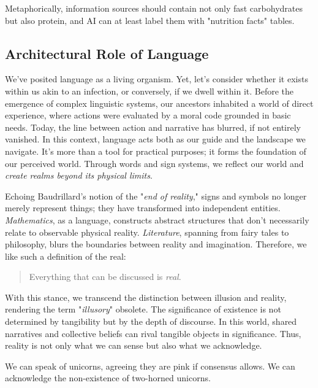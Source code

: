 \documentclass[11pt,a4]{article}
\begin{document}
    Metaphorically, information sources should contain not only fast carbohydrates but also protein, and AI can at least label them with "nutrition facts" tables.





    \subsection{Architectural Role of Language}
    We've posited language as a living organism. Yet, let's consider whether it exists within us akin to an infection, or conversely, if we dwell within it.
    Before the emergence of complex linguistic systems, our ancestors inhabited a world of direct experience, where actions were evaluated by a moral code grounded in basic needs. Today, the line between action and narrative has blurred, if not entirely vanished. In this context, language acts both as our guide and the landscape we navigate. It's more than a tool for practical purposes; it forms the foundation of our perceived world. Through words and sign systems, we reflect our world and \textit{create realms beyond its physical limits}.

    Echoing Baudrillard's notion of the "\textit{end of reality}," signs and symbols no longer merely represent things; they have transformed into independent entities.
    \textit{Mathematics}, as a language, constructs abstract structures that don't necessarily relate to observable physical reality. \textit{Literature}, spanning from fairy
    tales to philosophy, blurs the boundaries between reality and imagination. Therefore, we like such a definition of the real:

        \begin{quote}
            Everything that can be discussed is \textit{real}.
        \end{quote}

    With this stance, we transcend the distinction between illusion and reality, rendering the term "\textit{illusory}" obsolete. The significance of existence is not determined by tangibility but by the depth of discourse. In this world, shared narratives and collective beliefs can rival tangible objects in significance. Thus, reality is not only what we can sense but also what we acknowledge.

    We can speak of unicorns, agreeing they are pink if consensus allows. We can acknowledge the non-existence of two-horned unicorns.

\end{document}
